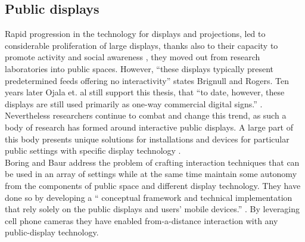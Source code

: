 \subsection{Public displays}
Rapid progression in the technology for displays and projections, led to considerable proliferation of large displays, thanks also to their capacity to promote activity and social awareness \cite{Huang:2003}, they moved out from research laboratories into public spaces. However, “these displays typically present predetermined feeds offering no interactivity”\cite{Brignull:2003} states Brignull and Rogers. Ten years later Ojala et. al still support this thesis, that “to date, however, these displays are still used primarily as one-way commercial digital signs.” \cite{Ojala:2012:MIP:2225044.2225065}. \\

Nevertheless researchers continue to combat and change this trend, as such a body of research has formed around interactive public displays. A large part of this body presents unique  solutions for installations and devices for particular public settings with specific display technology \cite{Schieck:2012:AEM:2393132.2393141}.\\

Boring and Baur address the problem of crafting interaction techniques that can be used in an array of settings while at the same time maintain some autonomy from the components of public space and different display technology. They have done so by developing a “ conceptual framework and technical implementation that rely solely on the public displays and users’ mobile devices.” \cite{Boring:2013}. By  leveraging cell phone cameras they have enabled from-a-distance interaction with any public-display technology.\\

